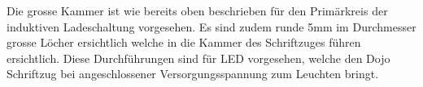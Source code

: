 Die grosse Kammer ist wie bereits oben beschrieben für den Primärkreis der induktiven Ladeschaltung vorgesehen. Es sind zudem runde 5mm im Durchmesser grosse Löcher ersichtlich welche in die Kammer des Schriftzuges führen ersichtlich. Diese Durchführungen sind für LED vorgesehen, welche den Dojo Schriftzug bei angeschlossener Versorgungsspannung zum Leuchten bringt. 